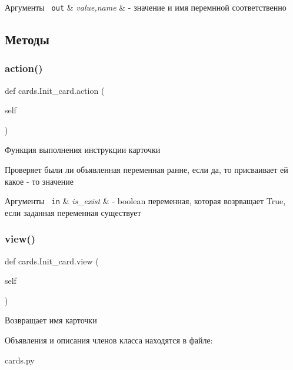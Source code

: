 \begin{DoxyParams}[1]{Аргументы}
\mbox{\texttt{ out}}  & {\em value,name} & -\/ значение и имя перемнной соответственно \\
\hline
\end{DoxyParams}


\subsection{Методы}
\mbox{\label{classcards_1_1_init__card_a04b39655343b2c0b9746afcc2475eed5}} 
\subsubsection{\texorpdfstring{action()}{action()}}
{\footnotesize\ttfamily def cards.\+Init\+\_\+card.\+action (\begin{DoxyParamCaption}\item[{}]{self }\end{DoxyParamCaption})}



Функция выполнения инструкции карточки 

Проверяет были ли объявленная переменная ранне, если да, то присваивает ей какое -\/ то значение 
\begin{DoxyParams}[1]{Аргументы}
\mbox{\texttt{ in}}  & {\em is\+\_\+exist} & -\/ boolean переменная, которая возрващает True, если заданная переменная существует \\
\hline
\end{DoxyParams}
\mbox{\label{classcards_1_1_init__card_a44f7968662b1ed4c536f96b360f7a2f9}} 
\subsubsection{\texorpdfstring{view()}{view()}}
{\footnotesize\ttfamily def cards.\+Init\+\_\+card.\+view (\begin{DoxyParamCaption}\item[{}]{self }\end{DoxyParamCaption})}



Возвращает имя карточки 



Объявления и описания членов класса находятся в файле\+:\begin{DoxyCompactItemize}
\item 
cards.\+py\end{DoxyCompactItemize}
